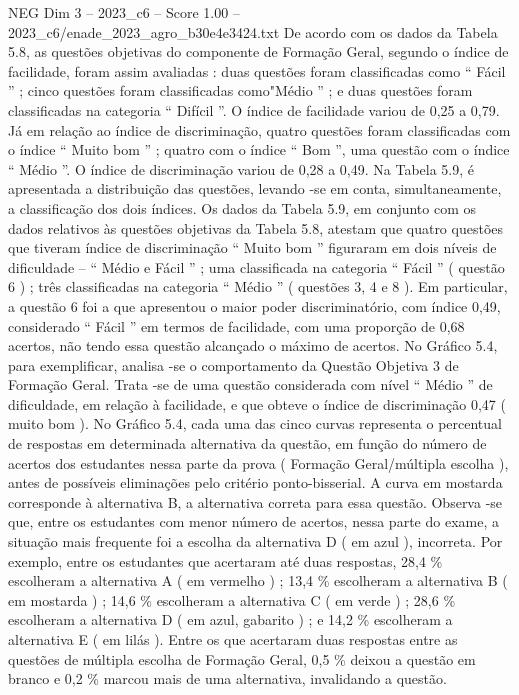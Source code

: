 \begin{textsample}{NEG Dim 3 – 2023\_c6 – Score 1.00 – 2023\_c6/enade\_2023\_agro\_b30e4e3424.txt}
De acordo com os dados da Tabela 5.8, as questões objetivas do componente de Formação Geral, segundo o índice de facilidade, foram assim avaliadas : duas questões foram classificadas como “ Fácil ” ; cinco questões foram classificadas como"Médio ” ; e duas questões foram classificadas na categoria “ Difícil ”.
O índice de facilidade variou de 0,25 a 0,79.
Já em relação ao índice de discriminação, quatro questões foram classificadas com o índice “ Muito bom ” ; quatro com o índice “ Bom ”, uma questão com o índice “ Médio ”.
O índice de discriminação variou de 0,28 a 0,49.
Na Tabela 5.9, é apresentada a distribuição das questões, levando -se em conta, simultaneamente, a classificação dos dois índices.
Os dados da Tabela 5.9, em conjunto com os dados relativos às questões objetivas da Tabela 5.8, atestam que quatro questões que tiveram índice de discriminação “ Muito bom ” figuraram em dois níveis de dificuldade – “ Médio e Fácil ” ; uma classificada na categoria “ Fácil ” ( questão 6 ) ; três classificadas na categoria “ Médio ” ( questões 3, 4 e 8 ).
Em particular, a questão 6 foi a que apresentou o maior poder discriminatório, com índice 0,49, considerado “ Fácil ” em termos de facilidade, com uma proporção de 0,68 acertos, não tendo essa questão alcançado o máximo de acertos.
No Gráfico 5.4, para exemplificar, analisa -se o comportamento da Questão Objetiva 3 de Formação Geral.
Trata -se de uma questão considerada com nível “ Médio ” de dificuldade, em relação à facilidade, e que obteve o índice de discriminação 0,47 ( muito bom ).
No Gráfico 5.4, cada uma das cinco curvas representa o percentual de respostas em determinada alternativa da questão, em função do número de acertos dos estudantes nessa parte da prova ( Formação Geral/múltipla escolha ), antes de possíveis eliminações pelo critério ponto-bisserial.
A curva em mostarda corresponde à alternativa B, a alternativa correta para essa questão.
Observa -se que, entre os estudantes com menor número de acertos, nessa parte do exame, a situação mais frequente foi a escolha da alternativa D ( em azul ), incorreta.
Por exemplo, entre os estudantes que acertaram até duas respostas, 28,4 \% escolheram a alternativa A ( em vermelho ) ; 13,4 \% escolheram a alternativa B ( em mostarda ) ; 14,6 \% escolheram a alternativa C ( em verde ) ; 28,6 \% escolheram a alternativa D ( em azul, gabarito ) ; e 14,2 \% escolheram a alternativa E ( em lilás ).
Entre os que acertaram duas respostas entre as questões de múltipla escolha de Formação Geral, 0,5 \% deixou a questão em branco e 0,2 \% marcou mais de uma alternativa, invalidando a questão.

\end{textsample}
